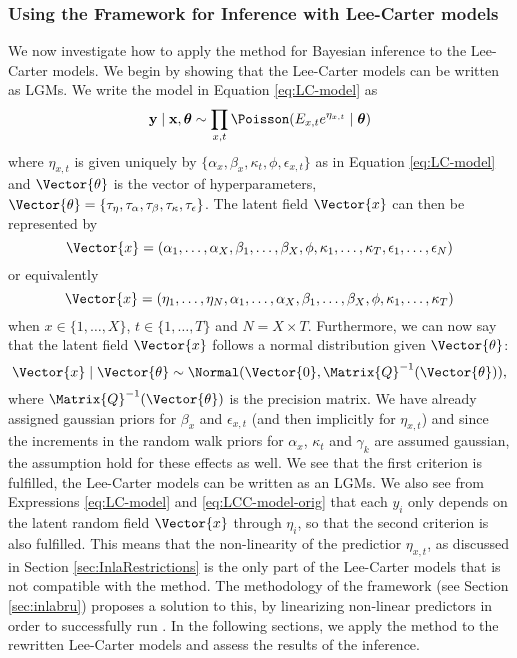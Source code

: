 \subsubsection{Using the \inla Framework for Inference with Lee-Carter models}
\newpar We now investigate how to apply the \inla method for Bayesian inference to the Lee-Carter models. We begin by showing that the Lee-Carter models can be written as LGMs. We write the model in Equation \ref{eq:LC-model} as 
\begin{equation}
    \textbf{y}\mid \textbf{x}, \boldsymbol{\theta} \sim \prod_{x,t}\Poisson(E_{x,t}e^{\eta_{x,t}}\mid \boldsymbol{\theta})
\end{equation}
where $\eta_{x,t}$ is given uniquely by $\{\alpha_x, \beta_x, \kappa_t, \phi, \epsilon_{x,t}\}$ as in Equation \ref{eq:LC-model} and $\Vector{\theta}$ is the vector of hyperparameters, $\Vector{\theta} = \{\tau_{\eta}, \tau_{\alpha}, \tau_{\beta}, \tau_{\kappa}, \tau_\epsilon\}$. The latent field $\Vector{x}$ can then be represented by 
\begin{equation*}
    \Vector{x} = (\alpha_1,\ldots,\alpha_X,\beta_1,\ldots,\beta_X, \phi, \kappa_1,\ldots, \kappa_T, \epsilon_1, \ldots, \epsilon_N)
\end{equation*}
or equivalently 
\begin{equation}
    \Vector{x} = (\eta_1,\ldots,\eta_N,\alpha_1,\ldots,\alpha_X,\beta_1,\ldots,\beta_X, \phi, \kappa_1,\ldots, \kappa_T)
    \label{eq:LChyperparams}
\end{equation}
when $x\in \{1,\ldots,X\}$, $t\in\{1,\ldots,T\}$ and $N=X\times T$. Furthermore, we can now say that the latent field $\Vector{x}$ follows a normal distribution given $\Vector{\theta}$:
\begin{equation}
        \Vector{x}\mid \Vector{\theta} \sim \Normal(\Vector{0}, \Matrix{Q}^{-1}(\Vector{\theta})),
        \label{eq:XNormalDist}
\end{equation}
where $\Matrix{Q}^{-1}(\Vector{\theta})$ is the precision matrix. We have already assigned gaussian priors for $\beta_x$ and $\epsilon_{x,t}$ (and then implicitly for $\eta_{x,t}$) and since the increments in the random walk priors for $\alpha_x$, $\kappa_t$ and $\gamma_k$ are assumed gaussian, the assumption hold for these effects as well. 
\newline
We see that the first criterion is fulfilled, the Lee-Carter models can be written as an LGMs. We also see from Expressions \ref{eq:LC-model} and \ref{eq:LCC-model-orig} that each $y_i$ only depends on the latent random field $\Vector{x}$ through $\eta_i$, so that the second criterion is also fulfilled. This means that the non-linearity of the predictior $\eta_{x,t}$, as discussed in Section \ref{sec:InlaRestrictions} is the only part of the Lee-Carter models that is not compatible with the \inla method. The methodology of the \inlabru framework (see Section \ref{sec:inlabru}) proposes a solution to this, by linearizing non-linear predictors in order to successfully run \inla. In the following sections, we apply the \inlabru method to the rewritten Lee-Carter models and assess the results of the inference. 

